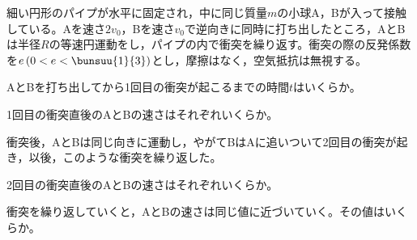 \item
    \begin{mawarikomi}{120pt}{}
        細い円形のパイプが水平に固定され，中に同じ質量$m$の小球A，Bが入って接触している。Aを速さ$2v_0$，Bを速さ$v_0$で逆向きに同時に打ち出したところ，AとBは半径$R$の等速円運動をし，パイプの内で衝突を繰り返す。衝突の際の反発係数を$e\left(0<e<\bunsuu{1}{3} \right)$とし，摩擦はなく，空気抵抗は無視する。
        \begin{Enumerate}
            \item AとBを打ち出してから1回目の衝突が起こるまでの時間$t$はいくらか。
            \item 1回目の衝突直後のAとBの速さはそれぞれいくらか。 
        \end{Enumerate}
        衝突後，AとBは同じ向きに運動し，やがてBはAに追いついて2回目の衝突が起き，以後，このような衝突を繰り返した。
        \begin{Enumerate*}
            \item 2回目の衝突直後のAとBの速さはそれぞれいくらか。
            \item 衝突を繰り返していくと，AとBの速さは同じ値に近づいていく。その値はいくらか。
        \end{Enumerate*}
    \end{mawarikomi}